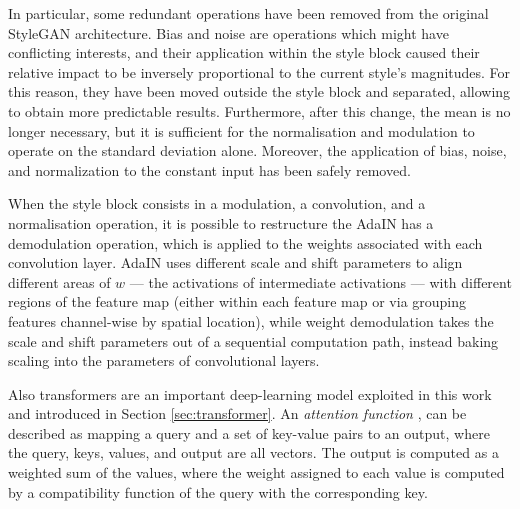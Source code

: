 \documentclass{article}
\begin{document}
	In particular, some redundant operations have been removed from the original StyleGAN architecture.
	Bias and noise are operations which might have conflicting interests, and their application within the 
	style block caused their relative impact to be inversely proportional to the current style’s 
	magnitudes. For this reason, they have been moved outside the style block and separated, allowing 
	to obtain more predictable results.
	Furthermore, after this change, the mean is no longer necessary, but it is sufficient for the 
	normalisation and modulation to operate on the standard deviation alone.
	Moreover, the application of bias, noise, and normalization to the constant input has been safely 
	removed. 
	
	When the style block consists in a modulation, a convolution, and a normalisation operation, it 
	is 
	possible to restructure the AdaIN has a demodulation operation, which is applied to the 
	weights 
	associated with each convolution layer. 
	AdaIN uses different scale and shift parameters to align different areas of $w$ — the 
	activations 
	of intermediate activations — with different regions of the feature map (either within each 
	feature 
	map or via grouping features channel-wise by spatial location), while weight demodulation 
	takes the 
	scale and shift parameters out of a sequential computation path, instead baking scaling into 
	the 
	parameters of convolutional layers.

	
	Also transformers are an important deep-learning model exploited in this work and introduced 
	in 
	Section \ref{sec:transformer}. 	
	An \textit{attention function} \cite{vaswani2017attention}, can be described as mapping a query and 
	a set of key-value pairs to an output, where the query, keys, values, and output are all vectors. The 
	output is computed as a weighted sum of the values, where the weight assigned to each value is 
	computed by a compatibility function of the query with the corresponding key.
	
\end{document}
